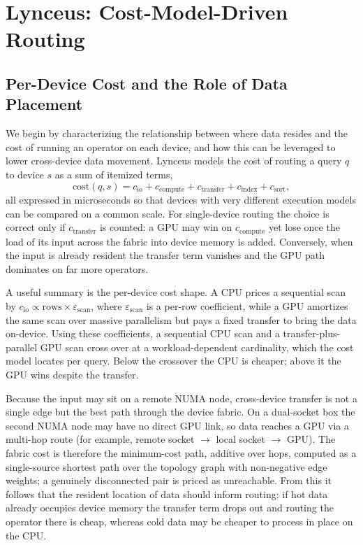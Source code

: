 \documentclass{article}
\begin{document}
\section{Lynceus: Cost-Model-Driven Routing}
\label{sec:lynceus}

\subsection{Per-Device Cost and the Role of Data Placement}
\label{sec:cost}

We begin by characterizing the relationship between where data resides and the
cost of running an operator on each device, and how this can be leveraged to
lower cross-device data movement. Lynceus models the cost of routing a query
$q$ to device $s$ as a sum of itemized terms,
\begin{equation}
\label{eq:cost}
\mathrm{cost}(q, s) = c_{\mathrm{io}} + c_{\mathrm{compute}} + c_{\mathrm{transfer}} + c_{\mathrm{index}} + c_{\mathrm{sort}},
\end{equation}
all expressed in microseconds so that devices with very different execution
models can be compared on a common scale. For single-device routing the choice
is correct only if $c_{\mathrm{transfer}}$ is counted: a GPU may win on
$c_{\mathrm{compute}}$ yet lose once the load of its input across the fabric into
device memory is added. Conversely, when the input is already resident the
transfer term vanishes and the GPU path dominates on far more operators.

A useful summary is the per-device cost shape. A CPU prices a sequential scan by
$c_{\mathrm{io}} \propto \text{rows} \times \varepsilon_{\mathrm{scan}}$, where
$\varepsilon_{\mathrm{scan}}$ is a per-row coefficient, while a GPU amortizes the
same scan over massive parallelism but pays a fixed transfer to bring the data
on-device. Using these coefficients, a sequential CPU scan and a
transfer-plus-parallel GPU scan cross over at a workload-dependent cardinality,
which the cost model locates per query. Below the crossover the CPU is cheaper;
above it the GPU wins despite the transfer.

Because the input may sit on a remote NUMA node, cross-device transfer is not a
single edge but the best path through the device fabric. On a dual-socket box the
second NUMA node may have no direct GPU link, so data reaches a GPU via a
multi-hop route (for example, remote socket $\to$ local socket $\to$ GPU). The
fabric cost is therefore the minimum-cost path, additive over hops, computed as a
single-source shortest path over the topology graph with non-negative edge
weights; a genuinely disconnected pair is priced as unreachable. From this it
follows that the resident location of data should inform routing: if hot data
already occupies device memory the transfer term drops out and routing the
operator there is cheap, whereas cold data may be cheaper to process in place on
the CPU.
\end{document}
